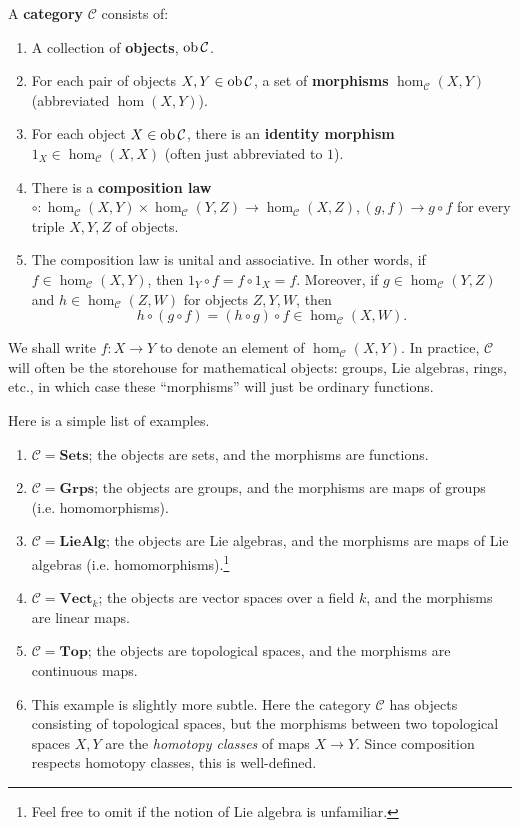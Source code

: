 \begin{definition}
A \textbf{category} $\mathcal{C}$ consists of:
\begin{enumerate}
\item  A collection of \textbf{objects},
$\operatorname{ob} \mathcal{C}$.
\item For each pair of objects $X, Y \in
\operatorname{ob} \mathcal{C}$, a set
of \textbf{morphisms} $\hom_{\mathcal{C}}(X, Y)$ (abbreviated $\hom(X,Y)$).
\item For each object $X \in \operatorname{ob}\mathcal{C}$, there is an \textbf{identity
morphism}
$1_X \in \hom_{\mathcal{C}}(X, X)$ (often just abbreviated to $1$).
\item There is a \textbf{composition law}
$\circ: \hom_{\mathcal{C}}(X, Y) \times \hom_{\mathcal{C}}(Y, Z) \to
\hom_{\mathcal{C}}(X, Z), (g, f) \to g
\circ f$ for every
triple $X, Y, Z$ of objects.
\item  The composition law is unital  and associative.
In other words, if $f \in \hom_{\mathcal{C}}(X, Y)$, then $1_Y \circ f = f
\circ 1_X = f$. Moreover, if $g \in \hom_{\mathcal{C}}(Y, Z)$ and $h \in
\hom_{\mathcal{\mathcal{C}}}(Z, W)$ for objects $Z, Y, W$, then
\[ h \circ (g \circ f) = (h \circ g) \circ f \in \hom_{\mathcal{C}}(X, W).   \]
\end{enumerate}
\end{definition}

We shall write $f: X \to Y$ to denote an element of $\hom_{\mathcal{C}}(X, Y)$.
In practice, $\mathcal{C}$ will often be the storehouse for mathematical objects: groups, Lie algebras,
rings, etc., in which case these ``morphisms'' will just be ordinary functions.

Here is a simple list of examples.
\begin{example}
\begin{enumerate}
\item $\mathcal{C}  = \mathbf{Sets}$; the objects are sets, and the morphisms
are functions.
\item $\mathcal{C} = \mathbf{Grps}$; the objects are groups, and the morphisms
are maps of groups (i.e. homomorphisms).
\item $\mathcal{C} = \mathbf{LieAlg}$; the objects are Lie algebras, and the
morphisms are maps of Lie algebras (i.e. homomorphisms).\footnote{Feel free to
omit if the notion of Lie algebra is unfamiliar.}
\item  $\mathcal{C} = \mathbf{Vect}_k$; the objects are vector spaces over a
field $k$, and the morphisms are linear maps.
\item $\mathcal{C} = \mathbf{Top}$; the objects are topological spaces, and the
morphisms are continuous maps.
\item  This example is slightly more subtle. Here the category $\mathcal{C}$
has objects consisting of topological spaces, but the morphisms between two
topological spaces $X,Y$ are the \emph{homotopy classes} of maps $X \to Y$.
Since composition respects homotopy classes, this is well-defined.
\end{enumerate}
\end{example}



